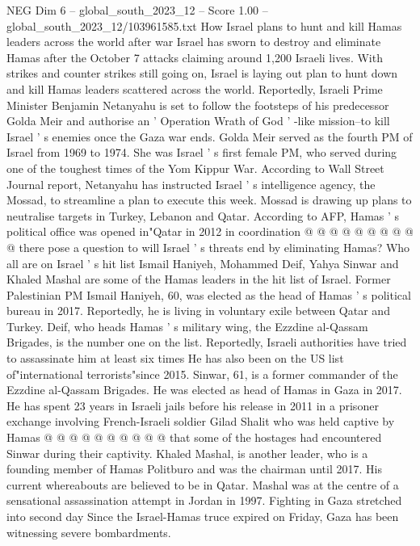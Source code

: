 \begin{textsample}{NEG Dim 6 – global\_south\_2023\_12 – Score 1.00 – global\_south\_2023\_12/103961585.txt}  \label{ex:f6_neg_323}
How Israel plans to hunt and kill Hamas leaders across the world after war Israel has sworn to destroy and eliminate Hamas after the October 7 attacks claiming around 1,200 Israeli lives.
With strikes and counter strikes still going on, Israel is laying out plan to hunt down and kill Hamas leaders scattered across the world.
Reportedly, Israeli Prime Minister Benjamin Netanyahu is set to follow the footsteps of his predecessor Golda Meir and authorise an ' Operation Wrath of God ' -like mission--to kill Israel ' s enemies once the Gaza war ends.
Golda Meir served as the fourth PM of Israel from 1969 to 1974.
She was Israel ' s first female PM, who served during one of the toughest times of the Yom Kippur War.
According to Wall Street Journal report, Netanyahu has instructed Israel ' s intelligence agency, the Mossad, to streamline a plan to execute this week.
Mossad is drawing up plans to neutralise targets in Turkey, Lebanon and Qatar.
According to AFP, Hamas ' s political office was opened in"Qatar in 2012 in coordination @ @ @ @ @ @ @ @ @ @ there pose a question to will Israel ' s threats end by eliminating Hamas?
Who all are on Israel ' s hit list Ismail Haniyeh, Mohammed Deif, Yahya Sinwar and Khaled Mashal are some of the Hamas leaders in the hit list of Israel.
Former Palestinian PM Ismail Haniyeh, 60, was elected as the head of Hamas ' s political bureau in 2017.
Reportedly, he is living in voluntary exile between Qatar and Turkey.
Deif, who heads Hamas ' s military wing, the Ezzdine al-Qassam Brigades, is the number one on the list.
Reportedly, Israeli authorities have tried to assassinate him at least six times He has also been on the US list of"international terrorists"since 2015.
Sinwar, 61, is a former commander of the Ezzdine al-Qassam Brigades.
He was elected as head of Hamas in Gaza in 2017.
He has spent 23 years in Israeli jails before his release in 2011 in a prisoner exchange involving French-Israeli soldier Gilad Shalit who was held captive by Hamas @ @ @ @ @ @ @ @ @ @ that some of the hostages had encountered Sinwar during their captivity.
Khaled Mashal, is another leader, who is a founding member of Hamas Politburo and was the chairman until 2017.
His current whereabouts are believed to be in Qatar.
Mashal was at the centre of a sensational assassination attempt in Jordan in 1997.
Fighting in Gaza stretched into second day Since the Israel-Hamas truce expired on Friday, Gaza has been witnessing severe bombardments.

\end{textsample}
